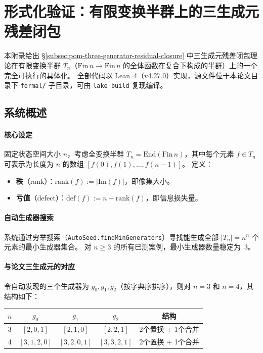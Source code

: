 \section{形式化验证：有限变换半群上的三生成元残差闭包}\label{app:formal-verification-lean}

本附录给出 \S\ref{subsec:pom-three-generator-residual-closure} 中三生成元残差闭包理论在有限变换半群 $T_n$（$\mathrm{Fin}\,n\to\mathrm{Fin}\,n$ 的全体函数在复合下构成的半群）上的一个完全可执行的具体化。
全部代码以 Lean~4（v4.27.0）实现，源文件位于本论文目录下 \texttt{formal/} 子目录，可由 \texttt{lake build} 复现编译。

\subsection{系统概述}

\paragraph{核心设定}
固定状态空间大小 $n$，考虑全变换半群 $T_n = \mathrm{End}(\mathrm{Fin}\,n)$，其中每个元素 $f\in T_n$ 可表示为长度为 $n$ 的数组 $[f(0),f(1),\dots,f(n{-}1)]$。
定义：
\begin{itemize}
  \item \textbf{秩}（rank）：$\mathrm{rank}(f):=|\mathrm{Im}(f)|$，即像集大小。
  \item \textbf{亏值}（defect）：$\mathrm{def}(f):=n-\mathrm{rank}(f)$，即信息损失量。
\end{itemize}

\paragraph{自动生成器搜索}
系统通过穷举搜索（\texttt{AutoSeed.findMinGenerators}）寻找能生成全部 $|T_n|=n^n$ 个元素的最小生成器集合。
对 $n\ge 3$ 的所有已测案例，最小生成器数量稳定为~$3$。

\paragraph{与论文三生成元的对应}
令自动发现的三个生成器为 $g_0,g_1,g_2$（按字典序排序），则对 $n=3$ 和 $n=4$，其结构如下：

\begin{center}
\begin{tabular}{c|ccc|c}
\toprule
$n$ & $g_0$ & $g_1$ & $g_2$ & 结构 \\
\midrule
3 & $[2,0,1]$ & $[2,1,0]$ & $[2,2,1]$ & 2个置换 $+$ 1个合并 \\
4 & $[3,1,2,0]$ & $[3,2,0,1]$ & $[3,3,2,1]$ & 2个置换 $+$ 1个合并 \\
\bottomrule
\end{tabular}
\end{center}

